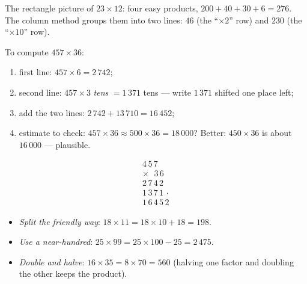\begin{omfigure}

{\small The rectangle picture of $23 \times 12$: four easy products,
$200 + 40 + 30 + 6 = 276$. The column method groups them into two
lines: $46$ (the ``$\times 2$'' row) and $230$ (the ``$\times 10$''
row).}
\end{omfigure}

\begin{method}\label{met:g4:mult:column}
To compute $457 \times 36$:
\begin{enumerate}
  \item first line: $457 \times 6 = 2\,742$;
  \item second line: $457 \times 3$ \emph{tens} $= 1\,371$ tens ---
        write $1\,371$ shifted one place left;
  \item add the two lines: $2\,742 + 13\,710 = 16\,452$;
  \item estimate to check: $457 \times 36 \approx 500 \times 36
        = 18\,000$? Better: $450 \times 36$ is about $16\,000$ ---
        plausible.
\end{enumerate}
\[
\begin{array}{r}
4\,5\,7 \\
\times\ \ \,3\,6 \\
\hline
2\,7\,4\,2 \\
1\,3\,7\,1\,\cdot \\
\hline
1\,6\,4\,5\,2
\end{array}
\]
\end{method}

\begin{example}\label{ex:g4:mult:tricks}
\begin{itemize}
  \item \emph{Split the friendly way}: $18 \times 11 = 18 \times 10
        + 18 = 198$.
  \item \emph{Use a near-hundred}: $25 \times 99 = 25 \times 100 -
        25 = 2\,475$.
  \item \emph{Double and halve}: $16 \times 35 = 8 \times 70 =
        560$ (halving one factor and doubling the other keeps the
        product).
\end{itemize}
\end{example}

